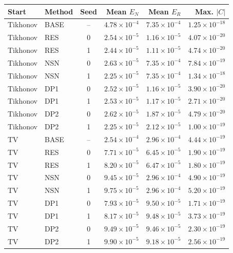 \begingroup\small\setlength{\tabcolsep}{4pt}\renewcommand{\arraystretch}{1.1}
\begin{tabular}{@{}llcrrr@{}}
\toprule
Start & Method & Seed & Mean $E_N$ & Mean $E_R$ & Max. $|C|$ \\ \midrule
Tikhonov & BASE & -- & $4.78\times10^{-4}$ & $7.35\times10^{-4}$ & $1.25\times10^{-18}$ \\
Tikhonov & RES & 0 & $2.54\times10^{-5}$ & $1.16\times10^{-5}$ & $4.07\times10^{-20}$ \\
Tikhonov & RES & 1 & $2.44\times10^{-5}$ & $1.11\times10^{-5}$ & $4.74\times10^{-20}$ \\
Tikhonov & NSN & 0 & $2.63\times10^{-5}$ & $7.35\times10^{-4}$ & $7.84\times10^{-19}$ \\
Tikhonov & NSN & 1 & $2.25\times10^{-5}$ & $7.35\times10^{-4}$ & $1.34\times10^{-18}$ \\
Tikhonov & DP1 & 0 & $2.52\times10^{-5}$ & $1.16\times10^{-5}$ & $3.90\times10^{-20}$ \\
Tikhonov & DP1 & 1 & $2.53\times10^{-5}$ & $1.17\times10^{-5}$ & $2.71\times10^{-20}$ \\
Tikhonov & DP2 & 0 & $2.62\times10^{-5}$ & $1.87\times10^{-5}$ & $4.79\times10^{-20}$ \\
Tikhonov & DP2 & 1 & $2.25\times10^{-5}$ & $2.12\times10^{-5}$ & $1.00\times10^{-19}$ \\
TV & BASE & -- & $2.54\times10^{-4}$ & $2.96\times10^{-4}$ & $4.44\times10^{-19}$ \\
TV & RES & 0 & $7.71\times10^{-5}$ & $6.45\times10^{-5}$ & $1.90\times10^{-19}$ \\
TV & RES & 1 & $8.20\times10^{-5}$ & $6.47\times10^{-5}$ & $1.80\times10^{-19}$ \\
TV & NSN & 0 & $9.45\times10^{-5}$ & $2.96\times10^{-4}$ & $4.90\times10^{-19}$ \\
TV & NSN & 1 & $9.75\times10^{-5}$ & $2.96\times10^{-4}$ & $5.20\times10^{-19}$ \\
TV & DP1 & 0 & $7.93\times10^{-5}$ & $9.50\times10^{-5}$ & $1.71\times10^{-19}$ \\
TV & DP1 & 1 & $8.17\times10^{-5}$ & $9.48\times10^{-5}$ & $3.73\times10^{-19}$ \\
TV & DP2 & 0 & $9.49\times10^{-5}$ & $9.46\times10^{-5}$ & $2.30\times10^{-19}$ \\
TV & DP2 & 1 & $9.90\times10^{-5}$ & $9.18\times10^{-5}$ & $2.56\times10^{-19}$ \\
\bottomrule
\end{tabular}\endgroup
